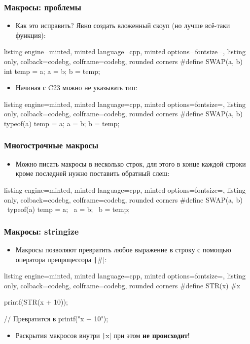 \documentclass[10pt]{beamer}
\begin{document}
\begin{frame}[fragile]
\frametitle{Макросы: проблемы}
\begin{itemize}
\item Как это исправить? \pause Явно создать вложенный скоуп (но лучше всё-таки функция):
\end{itemize}
\begin{tcblisting}{listing engine=minted, minted language=cpp, minted options={fontsize=\scriptsize}, listing only, colback=codebg, colframe=codebg, rounded corners}
#define SWAP(a, b) { int temp = a; a = b; b = temp; }
\end{tcblisting}
\pause
\begin{itemize}
\item Начиная с C23 можно не указывать тип:
\end{itemize}
\begin{tcblisting}{listing engine=minted, minted language=cpp, minted options={fontsize=\scriptsize}, listing only, colback=codebg, colframe=codebg, rounded corners}
#define SWAP(a, b) { typeof(a) temp = a; a = b; b = temp; }
\end{tcblisting}
\end{frame}

\begin{frame}[fragile]
\frametitle{Многострочные макросы}
\begin{itemize}
\item Можно писать макросы в несколько строк, для этого в конце каждой строки кроме последней нужно поставить обратный слеш:
\end{itemize}
\begin{tcblisting}{listing engine=minted, minted language=cpp, minted options={fontsize=\scriptsize}, listing only, colback=codebg, colframe=codebg, rounded corners}
#define SWAP(a, b) { \
  typeof(a) temp = a; \
  a = b; \
  b = temp; }
\end{tcblisting}
\end{frame}

\begin{frame}[fragile]
\frametitle{Макросы: stringize}
\begin{itemize}
\item Макросы позволяют превратить любое выражение в строку с помощью оператора препроцессора \texttt|#|:
\end{itemize}
\begin{tcblisting}{listing engine=minted, minted language=cpp, minted options={fontsize=\scriptsize}, listing only, colback=codebg, colframe=codebg, rounded corners}
#define STR(x) #x

printf(STR(x + 10));

// Превратится в
printf("x + 10");
\end{tcblisting}
\pause
{}
\begin{itemize}
\item Раскрытия макросов внутри \texttt|x| при этом \textbf{не происходит}!
\end{itemize}
\end{frame}
\end{document}
